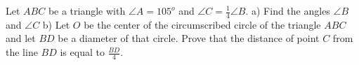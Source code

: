 Let $ABC$ be a triangle with $\angle A=105^o$ and $\angle C=\frac{1}{4} \angle B$.
a) Find the angles   $\angle B$ and  $\angle C$
b) Let $O$ be the center of the circumscribed circle of the triangle $ABC$ and let $BD$ be a diameter of that circle. Prove that the distance of point $C$ from the line $BD$ is equal to $\frac{BD}{4}$.